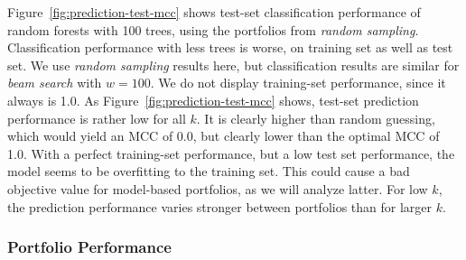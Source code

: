 \documentclass[conference]{IEEEtran}
\begin{document}
Figure~\ref{fig:prediction-test-mcc} shows test-set classification performance of random forests with 100 trees, using the portfolios from \emph{random sampling}.
Classification performance with less trees is worse, on training set as well as test set.
We use \emph{random sampling} results here, but classification results are similar for \emph{beam search} with $w=100$.
We do not display training-set performance, since it always is 1.0.
As Figure~\ref{fig:prediction-test-mcc} shows, test-set prediction performance is rather low for all $k$.
It is clearly higher than random guessing, which would yield an MCC of 0.0, but clearly lower than the optimal MCC of 1.0.
With a perfect training-set performance, but a low test set performance, the model seems to be overfitting to the training set.
This could cause a bad objective value for model-based portfolios, as we will analyze latter.
For low $k$, the prediction performance varies stronger between portfolios than for larger $k$.

\subsubsection{Portfolio Performance}
\end{document}

